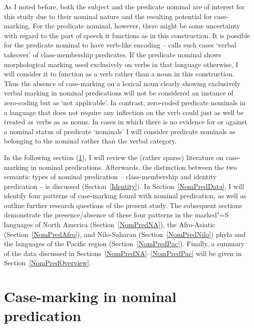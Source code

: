 As I noted before, both the subject and the predicate nominal are of interest for this study due to their nominal nature and the resulting potential for case-marking. 
For the predicate nominal, however, there might be some uncertainty with regard to the part of speech it functions as in this construction. 
It is possible for the predicate nominal to have verb-like encoding -- \citet{Stassen:1997} calls such cases `verbal takeover' of class-membership predicates. 
If the predicate nominal shows morphological marking used exclusively on verbs in that language otherwise, I will consider it to function as a verb rather than a noun in this construction. 
Thus the absence of case-marking on a lexical noun clearly showing exclusively verbal marking in nominal predications will not be considered an instance of zero-coding but as `not applicable'. 
In contrast, zero-coded predicate nominals in a language that does not require any inflection on the verb could just as well be treated as verbs as as nouns. 
In cases in which there is no evidence for or against a nominal status of predicate `nominals' I will consider predicate nominals as  belonging to the nominal rather than the verbal category. 

In the following section (\ref{CaseNomPred}), I will review the (rather sparse) literature on case-marking in nominal predications.
Afterwards, the distinction between the two semantic types of nominal predication -- class-membership and identity predication -- is discussed (Section~\ref{Identity}). 
In Section~\ref{NomPredData}, I will identify four patterns of case-marking found with nominal predication, as well as outline further research questions of the present study. 
The subsequent sections demonstrate the presence/absence of these four patterns in the marked"=S languages of North America (Section~\ref{NomPredNA}), the Afro-Asiatic (Section~\ref{NomPredAfro}), and Nilo-Saharan (Section~\ref{NomPredNilo}) phyla and the languages of the Pacific region (Section~\ref{NomPredPac}). 
Finally, a summary of the data discussed in Sections~\ref{NomPredNA}--\ref{NomPredPac} will be given in Section~\ref{NomPredOverview}. 


\section{Case-marking in nominal predication}\label{CaseNomPred}

